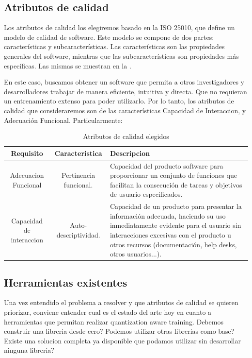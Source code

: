 \subsection{Atributos de calidad}
\label{sec:atributos_calidad}

Los atributos de calidad los elegiremos basado en la ISO 25010, que define un modelo de calidad de software. Este modelo se compone de dos partes: características y subcaracterísticas. Las características son las propiedades generales del software, mientras que las subcaracterísticas son propiedades más específicas. Las mismas se muestran en la . \\


En este caso, buscamos obtener un software que permita a otros investigadores y desarrolladores trabajar de manera eficiente, intuitiva y directa. Que no requieran un entrenamiento extenso para poder utilizarlo. Por lo tanto, los atributos de calidad que consideraremos son de las características Capacidad de Interaccion, y Adecuación Funcional. Particularmente:

\begin{table}[H]
\centering
\begin{tabular}{|c|c|p{6cm}|}
\hline
\textbf{Requisito} & \textbf{Caracteristica} & \textbf{Descripcion} \\ \hline
Adecuacion Funcional & Pertinencia funcional. & Capacidad del producto software para proporcionar un conjunto de funciones que facilitan la consecución de tareas y objetivos de usuario especificados. \\ \hline
Capacidad de interaccion & Auto-descriptividad. & Capacidad de un producto para presentar la información adecuada, haciendo su uso inmediatamente evidente para el usuario sin interacciones excesivas con el producto u otros recursos (documentación, help desks, otros usuarios...). \\ \hline
\end{tabular}
\caption{Atributos de calidad elegidos}
\label{tab:iso25010}
\end{table}

\subsection{Herramientas existentes}

Una vez entendido el problema a resolver y que atributos de calidad se quieren priorizar, conviene entender cual es el estado del arte hoy en cuanto a herramientas que permitan realizar quantization aware training. Debemos construir una libreria desde cero? Podemos utilizar otras librerias como base? Existe una solucion completa ya disponible que podamos utilizar sin desarrollar ninguna libreria?

